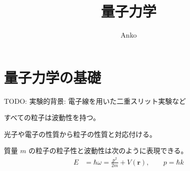 \documentclass[uplatex,dvipdfmx,a4paper,11pt]{jlreq}
\title{量子力学}
\author{Anko}
\newcommand{\rr}{\bm{r}}
\numberwithin{equation}{section}
\theoremstyle{definition}
\begin{document}
\maketitle
\tableofcontents
\clearpage

\section{量子力学の基礎}
TODO: 実験的背景: 電子線を用いた二重スリット実験など
\begin{axiom}[粒子の波動性]
  すべての粒子は波動性を持つ。
\end{axiom}
光子や電子の性質から粒子の性質と対応付ける。
\begin{definition}[ド・ブロイの関係式]
  質量 $m$ の粒子の粒子性と波動性は次のように表現できる。
  \begin{align}
    E & = \hbar\omega = \frac{p^2}{2m} + V(\rr), \qquad p = \hbar k
  \end{align}
\end{definition}
\end{document}

